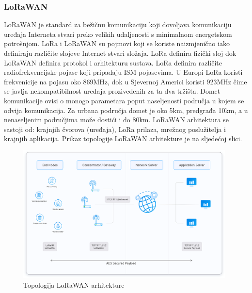 \documentclass[times, utf8, diplomski]{fer}
\begin{document}
\subsubsection{LoRaWAN}
LoRaWAN  je standard za bežičnu komunikaciju koji dovoljava komunikaciju uređaja Interneta stvari preko velikih udaljenosti s minimalnom energetskom potrošnjom. LoRa i LoRaWAN su pojmovi koji se koriste naizmjenično iako definiraju različite slojeve Internet stvari složaja. LoRa definira fizički sloj dok LoRaWAN definira protokol i arhitekturu sustava. LoRa definira različite radiofrekvencijske pojase koji pripadaju ISM pojasevima. U Europi LoRa koristi frekvenicije na pojasu oko 869MHz, dok u Sjevernoj Americi koristi 923MHz čime se javlja nekompatibilnost uređaja prozivedenih za ta dva tržišta. Domet komunikacije ovisi o monogo parametara poput naseljenosti područja u kojem se odvija komunikacija. Za urbana područja domet je oko 5km, predgrađa 10km, a u nenaseljenim područjima može dostići i do 80km.
LoRaWAN arhitektura se sastoji od: krajnjih čvorova (uređaja), LoRa prilaza, mrežnog poslužitelja i krajnjih aplikacija. Prikaz topologije LoRaWAN arhitekture je na sljedećoj slici.
\begin{figure}[H]
    \centering
    \includegraphics[width=11cm]{images/lorawan.png}
    \caption{Topologija LoRaWAN arhitekture\citep{LoraWANImg}}
    \label{fig:lorawan}
\end{figure}
\end{document}
